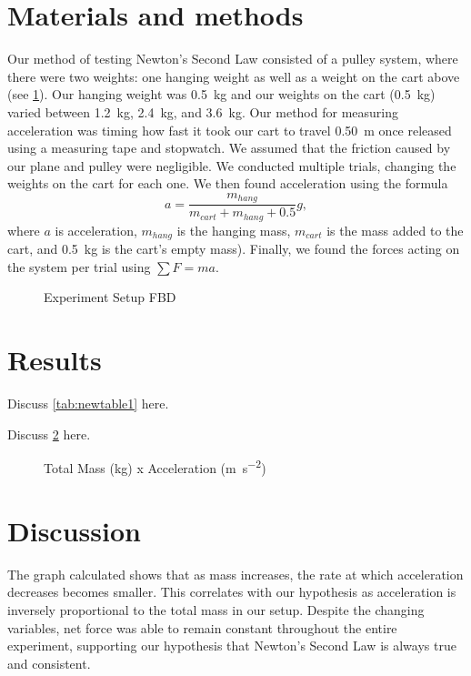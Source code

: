 ﻿\documentclass[reprint,amsmath,amssymb.aps]{revtex4-2}
\begin{document}
\section{Materials and methods}
Our method of testing Newton’s Second Law consisted of a pulley system, where there were two weights: one hanging weight as well as a weight on the cart above (see \cref{fig:1}). Our hanging weight was \qty{0.5}{\kilo\gram} and our weights on the cart (\qty{0.5}{\kilo\gram}) varied between \qty{1.2}{\kilo\gram}, \qty{2.4}{\kilo\gram}, and \qty{3.6}{\kilo\gram}. Our method for measuring acceleration was timing how fast it took our cart to travel \qty{0.50}{\meter} once released using a measuring tape and stopwatch. We assumed that the friction caused by our plane and pulley were negligible. We conducted multiple trials, changing the weights on the cart for each one. We then found acceleration using the formula
\begin{equation}
a = \dfrac{m_{hang}}{m_{cart}+m_{hang}+0.5} g,
\end{equation}
where $a$ is acceleration, $m_{hang}$ is the hanging mass, $m_{cart}$ is the mass added to the cart, and \qty{0.5}{\kilo\gram} is the cart's empty mass). Finally, we found the forces acting on the system per trial using $\sum F = ma$.

\begin{figure}
\caption{Experiment Setup FBD}
\label{fig:1}
\end{figure}


\section{Results}
Discuss \cref{tab:newtable1} here. 

%	
%

Discuss \cref{fig:2} here. 
\begin{figure}
\begin{center}

\end{center}
\caption{Total Mass (\unit{\kilo\gram}) x Acceleration (\unit{\meter\per\second\squared})}
\label{fig:2}
\end{figure}


\section{Discussion}
The graph calculated shows that as mass increases, the rate at which acceleration decreases becomes smaller. This correlates with our hypothesis as acceleration is inversely proportional to the total mass in our setup. Despite the changing variables, net force was able to remain constant throughout the entire experiment, supporting our hypothesis that Newton’s Second Law is always true and consistent. 
\end{document}
